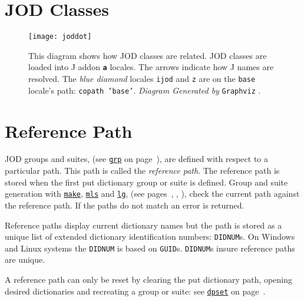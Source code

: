      
   \newpage
   \section{JOD Classes}\label{ap:classes}
   
   \begin{figure}[htbp]
  \centering
  \texttt{[image: joddot]}
  \caption[JOD Classes]{This diagram shows how 
    JOD classes are related. JOD classes are loaded into 
    J addon \textbf{\texttt{a}} locales. The arrows indicate how J names are resolved.
    The \emph{blue diamond} locales \texttt{ijod} and \texttt{z} are on the \texttt{base} locale's 
    path: \texttt{copath 'base'}. \emph{Diagram Generated by} \texttt{Graphviz} \cite{jwiki:graphviz}.    
    }
   \label{eps:joddot}
   \end{figure}
   
   \newpage
   \section{Reference Path}\label{ap:refpath}
   
   JOD groups and suites, (see \hyperlink{il:grp}{\texttt{grp}} on page~\pageref{ss:grp}), are defined with respect to a particular path.  This path is called the \emph{reference path}.  The reference path is stored when the first put dictionary group or 
suite is defined.   Group and suite generation with \hyperlink{il:make}{\texttt{make}}, \hyperlink{il:mls}{\texttt{mls}} and  \hyperlink{il:lg}{\texttt{lg}}, (see pages~\pageref{ss:make}, \pageref{ss:mls}, \pageref{ss:lg}), check the current path against the reference path.  If the paths do not match an error is returned.

Reference paths display current dictionary names but the path is 
stored as a unique list of extended dictionary 
identification numbers: \texttt{DIDNUM}s.  On Windows and Linux 
systems the \texttt{DIDNUM} is based 
on \texttt{GUID}s.  \texttt{DIDNUM}s insure reference paths are unique.


A reference path can only be reset by clearing the put dictionary
 path, opening desired dictionaries and recreating a group or suite: see \hyperlink{il:dpset}{\texttt{dpset}} on page~\pageref{ss:dpset}.

